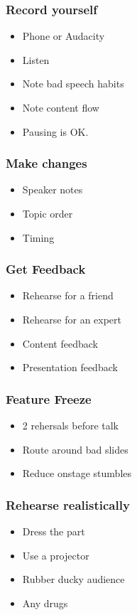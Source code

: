 \documentclass{beamer}
\begin{document}
\begin{frame}[fragile]
\frametitle{Record yourself}
\begin{itemize}[<+(1)->]
\item Phone or Audacity
\item Listen
\item Note bad speech habits
\item Note content flow
\item Pausing is OK.
\end{itemize}
\end{frame}

\begin{frame}[fragile]
\frametitle{Make changes}
\begin{itemize}[<+(1)->]
\item Speaker notes
\item Topic order
\item Timing
\end{itemize}
\end{frame}

\begin{frame}[fragile]
\frametitle{Get Feedback}
\begin{itemize}[<+(1)->]
\item Rehearse for a friend
\item Rehearse for an expert
\item Content feedback
\item Presentation feedback
\end{itemize}
\end{frame}

\begin{frame}[fragile]
\frametitle{Feature Freeze}
\begin{itemize}[<+(1)->]
\item 2 rehersals before talk
\item Route around bad slides
\item Reduce onstage stumbles
\end{itemize}
\end{frame}

\begin{frame}[fragile]
\frametitle{Rehearse realistically}
\begin{itemize}[<+(1)->]
\item Dress the part
\item Use a projector
\item Rubber ducky audience
\item Any drugs
\end{itemize}
\end{frame}
\end{document}

